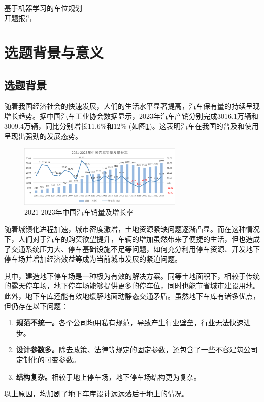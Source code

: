 \begin{center}
    \heiti {}基于机器学习的车位规划\\
    开题报告
\end{center}
\songti {}
\section{选题背景与意义}
\subsection{选题背景}
随着我国经济社会的快速发展，人们的生活水平显著提高，汽车保有量的持续呈现增长趋势。据中国汽车工业协会数据显示，2023年汽车产销分别完成3016.1万辆和3009.4万辆，同比分别增长11.6\%和12\% (如图\ref{fig:cars_sales})。这表明汽车在我国的普及和使用呈现出强劲的发展态势。
\begin{figure}[H]
  \centering
  \includegraphics[width=0.7\textwidth]{pictures/2021-2023年中国汽车销量及增长率.png}
  \caption{2021-2023年中国汽车销量及增长率}
  \label{fig:cars_sales}
\end{figure}
随着城镇化进程加速\cite{XXCZ202306017}，城市密度激增\cite{JZXB201004006}，土地资源紧缺问题逐渐凸显。而在这种情况下，人们对于汽车的购买欲望提升，车辆的增加虽然带来了便捷的生活，但也造成了交通系统压力大、停车基础设施不足等问题\cite{CSDQ200708009}，如何充分利用停车资源、开发地下停车场\cite{JSSD201905002}并增加经济效益等成为当前城市发展的紧迫问题。

其中，建造地下停车场是一种极为有效的解决方案。同等土地面积下，相较于传统的露天停车场，地下停车场能够提供更多的停车位\cite{1022811825.nh}，同时也能节省城市建设用地。此外，地下车库还能有效地缓解地面动静态交通矛盾\cite{CSDQ201807120}。虽然地下车库有诸多优点，但仍存在以下问题：
\begin{enumerate}
    \item {\bfseries 规范不统一。}各个公司均用私有规范，导致产生行业壁垒，行业无法快速进步。
    \item {\bfseries 设计参数多。}除去政策、法律等规定的固定参数\cite{ZGBZ202119043}，还包含了一些不容建筑公司定制化的可变参数。
    \item {\bfseries 结构复杂。}相较于地上停车场，地下停车场结构更为复杂。
\end{enumerate}
以上原因，均加剧了地下车库设计远远落后于地上的情况。

